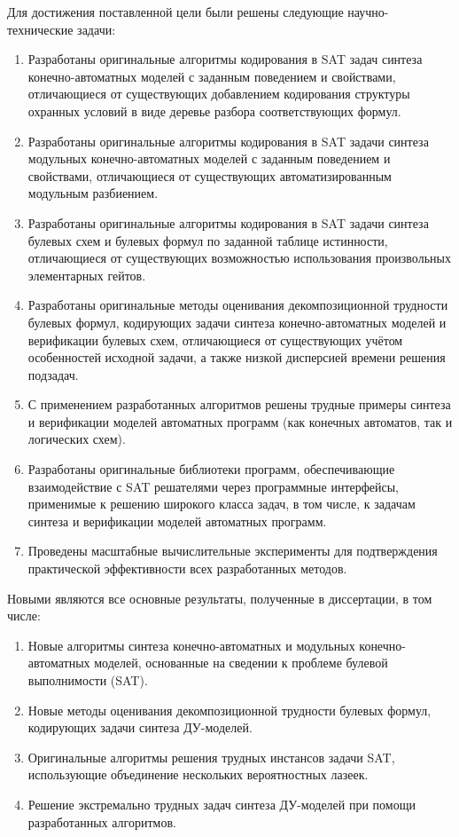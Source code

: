 \tasks
%
Для достижения поставленной цели были решены следующие научно-технические задачи:
\begin{enumerate}[beginpenalty=10000]
    \item Разработаны оригинальные алгоритмы кодирования в SAT задач синтеза конечно-автоматных моделей с заданным поведением и свойствами, отличающиеся от существующих добавлением кодирования структуры охранных условий в виде деревье разбора соответствующих формул.
    \item Разработаны оригинальные алгоритмы кодирования в SAT задачи синтеза модульных конечно-автоматных моделей с заданным поведением и свойствами, отличающиеся от существующих автоматизированным модульным разбиением.
    \item Разработаны оригинальные алгоритмы кодирования в SAT задачи синтеза булевых схем и булевых формул по заданной таблице истинности, отличающиеся от существующих возможностью использования произвольных элементарных гейтов.
    \item Разработаны оригинальные методы оценивания декомпозиционной трудности булевых формул, кодирующих задачи синтеза конечно-автоматных моделей и верификации булевых схем, отличающиеся от существующих учётом особенностей исходной задачи, а также низкой дисперсией времени решения подзадач.
    \item С применением разработанных алгоритмов решены трудные примеры синтеза и верификации моделей автоматных программ (как конечных автоматов, так и логических схем).
    \item Разработаны оригинальные библиотеки программ, обеспечивающие взаимодействие с SAT решателями через программные интерфейсы, применимые к решению широкого класса задач, в том числе, к задачам синтеза и верификации моделей автоматных программ.
    \item Проведены масштабные вычислительные эксперименты для подтверждения практической эффективности всех разработанных методов.
\end{enumerate}


\novelty
%
Новыми являются все основные результаты, полученные в диссертации, в том числе:
\begin{enumerate}[beginpenalty=10000]
    \item Новые алгоритмы синтеза конечно-автоматных и модульных конечно-автоматных моделей, основанные на сведении к проблеме булевой выполнимости (SAT).

    \item Новые методы оценивания декомпозиционной трудности булевых формул, кодирующих задачи синтеза ДУ-моделей.

    \item Оригинальные алгоритмы решения трудных инстансов задачи SAT, использующие объединение нескольких вероятностных лазеек.

    \item Решение экстремально трудных задач синтеза ДУ-моделей при помощи разработанных алгоритмов.
\end{enumerate}


